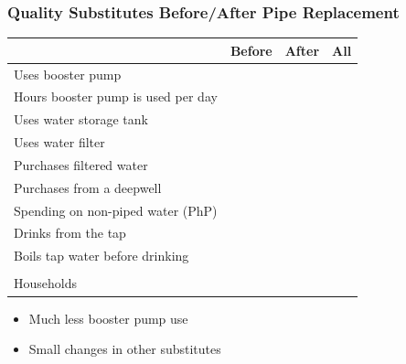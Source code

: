 \documentclass[aspectratio=32]{beamer}
\begin{document}



\begin{frame}
\frametitle{Quality Substitutes Before/After Pipe Replacement}
\centering

\begin{table}[h!] 
\centering
\begin{threeparttable}
\begin{tabular}{@{}l*{1}{ccc}@{}}
\toprule
  & Before & After  & All \\
\midrule
Uses booster pump &  \\
Hours booster pump is used per day &  \\
Uses water storage tank &  \\
Uses water filter &  \\
Purchases filtered water &  \\
Purchases from a deepwell &  \\
Spending on non-piped water (PhP) &  \\
Drinks from the tap &  \\
Boils tap water before drinking &  \\
\\[-.5em]
Households &  \\
\bottomrule
\end{tabular}
\begin{tablenotes}
\footnotesize
\item 
\end{tablenotes}
\end{threeparttable}
\end{table}
\begin{itemize}
  \item Much less booster pump use
  \item Small changes in other substitutes
\end{itemize}

\end{frame}

\end{document}
